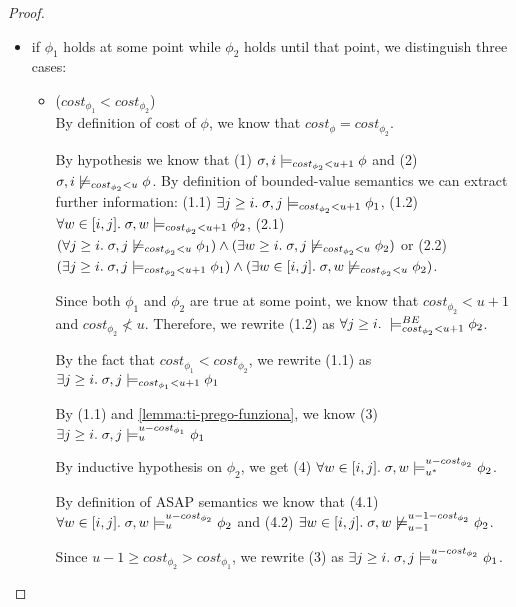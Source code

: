 \begin{theorem}
\begin{proof}
\begin{itemize}
\begin{itemize}
        
        \item if $\phi_1$ holds at some point while $\phi_2$ holds until that point, we distinguish three cases:
        \begin{itemize}
            \item ($cost_{\phi_1} < cost_{\phi_2}$) \\
            By definition of cost of $\phi$, we know that $cost_\phi = cost_{\phi_2}$.
            
            By hypothesis we know that 
            (1) $\sigma, i \models_{cost_{\phi_2} < u + 1} \phi$ and 
            (2) $\sigma, i \not\models_{cost_{\phi_2} < u} \phi$.
            By definition of bounded-value semantics we can extract further information: 
            (1.1) $\exists j \geq i.\; \sigma,j \models_{cost_{\phi_2} < u + 1} \phi_1$,
            (1.2) $\forall w \in [i,j].\; \sigma,w \models_{cost_{\phi_2} < u + 1} \phi_2$, 
            (2.1) $(\forall j \geq i.\; \sigma,j \not\models_{cost_{\phi_2} < u} \phi_1) \land (\exists w \geq i.\; \sigma,j \not\models_{cost_{\phi_2} < u} \phi_2)$ or 
            (2.2) $(\exists j \geq i.\; \sigma,j \models_{cost_{\phi_2} < u + 1} \phi_1) \land (\exists w \in [i,j].\; \sigma,w \not\models_{cost_{\phi_2} < u} \phi_2)$.

            Since both $\phi_1$ and $\phi_2$ are true at some point, we know that $cost_{\phi_2} < u + 1$ and $cost_{\phi_2} \not< u$.
            Therefore, we rewrite (1.2) as $\forall j \geq i.\; \models_{cost_{\phi_2} < u + 1}^{BE} \phi_2$.

            By the fact that $cost_{\phi_1} < cost_{\phi_2}$, we rewrite (1.1) as $\exists j \geq i.\; \sigma,j \models_{cost_{\phi_1} < u + 1} \phi_1$

            By (1.1) and \autoref{lemma:ti-prego-funziona}, we know (3) $\exists j \geq i.\; \sigma,j \models_{u}^{u-cost_{\phi_1}} \phi_1$ 

            By inductive hypothesis on $\phi_2$, we get (4) $\forall w \in [i,j].\; \sigma,w \models_{{u}^*}^{u-cost_{\phi_2}} \phi_2$.

            By definition of ASAP semantics we know that (4.1) $\forall w \in [i,j].\; \sigma,w \models_{u}^{u-cost_{\phi_2}} \phi_2$ and (4.2) $\exists w \in [i,j].\; \sigma,w \not\models_{u-1}^{u-1-cost_{\phi_2}} \phi_2$.
            
            Since $u-1 \geq cost_{\phi_2} > cost_{\phi_1}$, we rewrite (3) as $\exists j \geq i.\; \sigma,j \models_{u}^{u-cost_{\phi_2}} \phi_1$.


\end{itemize}
\end{itemize}
\end{itemize}
\end{proof}
\end{theorem}
